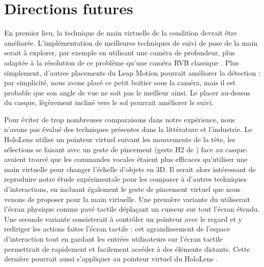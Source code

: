 \section{Directions futures}
\label{sec:discussion_future}

En premier lieu, la technique de main virtuelle de la condition  devrait être améliorée. L'implémentation de meilleures techniques de suivi de pose de la main serait à explorer, par exemple en utilisant une caméra de profondeur, plus adaptée à la résolution de ce problème qu'une caméra RVB classique \citep{Taylor2016}. Plus simplement, d'autres placements du Leap Motion pourrait améliorer la détection : par simplicité, nous avons placé ce petit boitier sous la caméra, mais il est probable que son angle de vue ne soit pas le meilleur ainsi. Le placer au-dessus du casque, légèrement incliné vers le sol pourrait améliorer le suivi.

Pour éviter de trop nombreuses comparaisons dans notre expérience, nous n'avons pas évalué des techniques présentes dans la littérature et l'industrie. Le HoloLens utilise un pointeur virtuel suivant les mouvements de la tête, les sélections se faisant avec un geste de pincement (geste H2 de \cite{Piumsomboon2013}) face au casque. \cite{Piumsomboon2014} avaient trouvé que les commandes vocales étaient plus efficaces qu'utiliser une main virtuelle pour changer l'échelle d'objets en 3D. Il serait alors intéressant de reproduire notre étude expérimentale pour les comparer à d'autres techniques d'interactions, en incluant également le geste de pincement virtuel que nous venons de proposer pour la main virtuelle. Une première variante du  utiliserait l'écran physique comme pavé tactile déplaçant un curseur sur tout l'écran étendu. Une seconde variante consisterait à contrôler un pointeur avec le regard et y rediriger les actions faites l'écran tactile  : cet agrandissement de l'espace d'interaction tout en gardant les entrées utilisateurs sur l'écran tactile permettrait de rapidement et facilement accéder à des éléments distants. Cette dernière pourrait aussi s'appliquer au pointeur virtuel du HoloLens .


